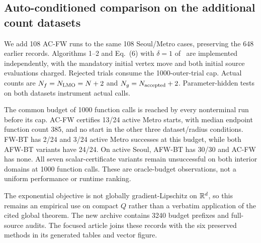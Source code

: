 \subsection{Auto-conditioned comparison on the additional count datasets}
We add 108 AC-FW runs to the same 108 Seoul/Metro cases, preserving the
648 earlier records. Algorithms 1--2 and Eq.~(6) with $\delta=1$
of~\cite{autoconditioned} are implemented independently, with the
mandatory initial vertex move and both initial source evaluations
charged. Rejected trials consume the 1000-outer-trial cap. Actual
counts are $N_f=N_{\rm LMO}=N+2$ and $N_g=N_{\rm accepted}+2$.
Parameter-hidden tests on both datasets instrument actual calls.

The common budget of 1000 function calls is reached by every
nonterminal run before its cap. AC-FW certifies 13/24 active Metro
starts, with median endpoint function count 385, and no start in the
other three dataset/radius conditions. FW-BT has 2/24 and 3/24
active Metro successes at this budget, while both AFW-BT variants
have 24/24. On active Seoul, AFW-BT has 30/30 and AC-FW has none.
All seven scalar-certificate variants remain unsuccessful on both
interior domains at 1000 function calls. These are oracle-budget
observations, not a uniform performance or runtime ranking.

The exponential objective is not globally gradient-Lipschitz on
$\mathbb R^d$, so this remains an empirical use on compact $Q$ rather than
a verbatim application of the cited global theorem. The new archive
contains 3240 budget prefixes and full-source audits. The focused
article joins these records with the six preserved methods in its
generated tables and vector figure.
